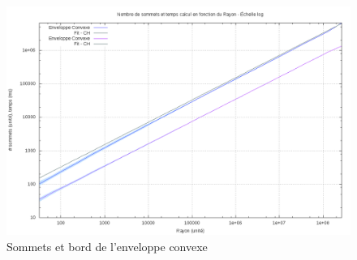 \begin{figure}[h!]
  \centering
  \includegraphics[width=\linewidth]{fig/4-exi/ch/exi-ch-sommet.png}
  \caption{Sommets et bord de l'enveloppe convexe}
\end{figure}

